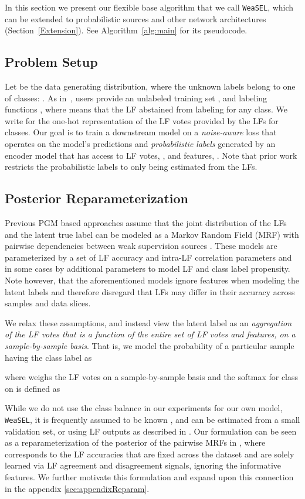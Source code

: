 \documentclass{article}
\newcommand{\weasel}{\texttt{WeaSEL}}\newcommand{\brackets}[1]{\left( #1 \right)}
\begin{document}
In this section we present our flexible base algorithm that we call \weasel, which can be extended to probabilistic sources and other network architectures (Section~\ref{Extension}). See Algorithm~\ref{alg:main} for its pseudocode. 

\subsection{Problem Setup} \label{ProblemSetup}
Let  be the data generating distribution, where the unknown labels belong to one of  classes: .
As in~\cite{DP}, users provide an unlabeled training set , and  labeling functions , where  means that the LF abstained from labeling for any class.
We write  for the one-hot representation of the LF votes provided by the  LFs for  classes. Our goal is to train a downstream model  on a \emph{noise-aware} loss  that operates on the model's predictions  and \emph{probabilistic labels}  generated by an encoder model  that has access to LF votes, , and features, . Note that prior work restricts the probabilistic labels to only being estimated from the LFs.\subsection{Posterior Reparameterization}
Previous PGM based approaches assume that the joint distribution  of the LFs and the latent true label can be modeled as a Markov Random Field (MRF) with pairwise dependencies between weak supervision sources \cite{DP, Snorkel, Multitask, triplets, TripletsMean}. These models are parameterized by a set of LF accuracy and intra-LF correlation parameters and in some cases by additional parameters to model LF and class label propensity.
Note however, that the aforementioned models ignore features  when modeling the latent labels and therefore disregard that LFs may differ in their accuracy across samples and data slices.
 
We relax these assumptions, and instead view the latent label as an \emph{aggregation of the LF votes that is a function of the entire set of LF votes and features, on a sample-by-sample basis}.
That is, we model the probability of a particular sample  having the class label  as

where  weighs the LF votes on a sample-by-sample basis and the softmax for class  on  is defined as

While we do not use the class balance  in our experiments for our own model, \weasel, it is frequently assumed to be known \cite{Multitask, triplets, TripletsMean}, and can be estimated from a small validation set, or  using LF outputs as described in \cite{Multitask}. 
Our formulation can be seen as a reparameterization of the posterior of the pairwise MRFs in \cite{Snorkel, Multitask, triplets}, where  corresponds to the LF accuracies that are fixed across the dataset and are solely learned via LF agreement and disagreement signals, ignoring the informative features. 
We further motivate this formulation and expand upon this connection in the appendix \ref{sec:appendixReparam}.
\end{document}
